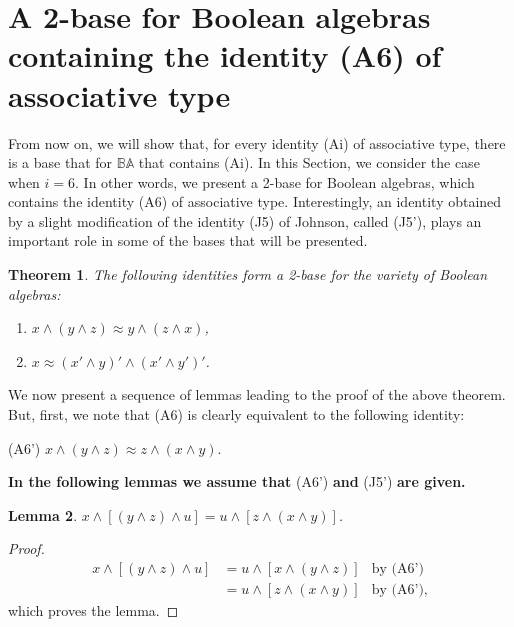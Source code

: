 \documentclass{amsart}
\theoremstyle{plain}
\newtheorem{theorem}{Theorem}[section]
\newtheorem{lemma}[theorem]{Lemma}
\theoremstyle{problem}
\theoremstyle{definition}
\theoremstyle{remark}
\numberwithin{equation}{section}
\begin{document}
 


\medskip
\section{A 2-base for Boolean algebras containing the identity (A6) of associative type}

From now on, we will show that, for every identity (Ai) of associative type, there is a base that for $\mathbb{BA}$ that contains (Ai). 
    In this Section, we consider the case when $i=6$.  In other words, we present a 2-base for Boolean algebras, which contains the identity (A6) of associative type.  Interestingly, an identity obtained by a slight modification of the identity (J5) of Johnson, called (J5'), plays an important role in some of the bases that will be presented.
    
\begin{theorem} \label{T4.1}  
    The following identities form a 2-base for the variety of Boolean algebras:
\begin{enumerate}
   \item[{\rm(A6)}] $x \land (y \land  z) \approx y \land  (z \land  x)$,
   \item[{\rm(J5')}] ${x \approx (x' \land y)' \land (x' \land y')'}$.
\end{enumerate}
\end{theorem}

  
   We now present a sequence of lemmas leading to the proof of the above theorem.
  But, first, we note that (A6) is clearly equivalent to the following identity:
    
    (A6') ${x \land ( y \land z )\approx z \land (x \land y)}$. 
    
    {\bf In the following lemmas we assume that} (A6') {\bf and} (J5') {\bf are given.}

    
\begin{lemma} \label{42}
    $x \land [(y \land z) \land u] = u \land [z \land (x \land y)]$.
\end{lemma}

\begin{proof}
\begin{align*}
   x \land [(y \land z) \land u] &= u \land [x \land (y \land z)] &\text{by (A6')}\\
                                 &= u\land [ z \land (x \land y)] &\text{by (A6')},
\end{align*}
which proves the lemma.
\end{proof}
\end{document}
